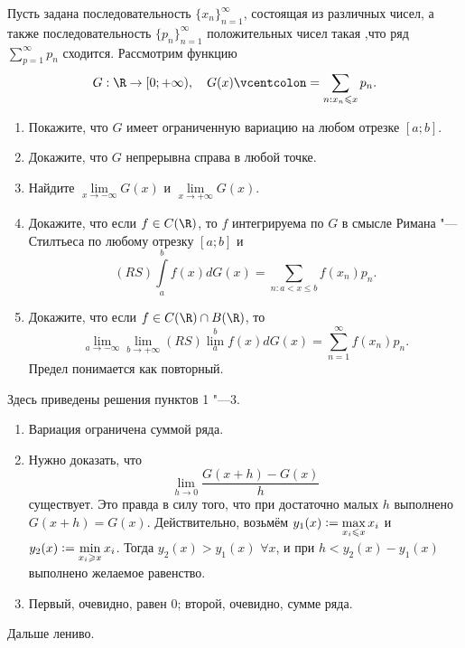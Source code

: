\begin{problem}[34]
    Пусть задана последовательность $\{x_n\}_{n = 1}^\infty$, состоящая из различных чисел, а также последовательность $\{p_n\}_{n = 1}^\infty$ положительных чисел такая ,что ряд $\sum\limits_{p = 1}^\infty p_n$ сходится. Рассмотрим функцию
    \[
        G: \R \to [0; +\infty),\quad G(x) \vcentcolon = \sum_{n: x_n \leqslant x}p_n.
    \]
    \begin{enumerate}[nolistsep]
        \item Покажите, что $G$ имеет ограниченную вариацию на любом отрезке $[a; b]$.
        \item Докажите, что $G$ непрерывна справа в любой точке.
        \item Найдите $\lim\limits_{x \to -\infty}G(x)$ и $\lim\limits_{x \to +\infty}G(x)$.
        \item Докажите, что если $f \in C(\R)$, то $f$ интегрируема по $G$ в смысле Римана "---Стилтьеса по любому отрезку $[a; b]$ и
            \[
                (RS)\int\limits_a^bf(x)dG(x) = \sum_{n: a < x \leqslant b}f(x_n)p_n.
            \]
        \item Докажите, что если $f \in C(\R) \cap B(\R)$, то
            \[
                \lim_{a \to -\infty}\lim_{b \to +\infty}(RS)\lim\limits_a^bf(x)dG(x) = \sum_{n = 1}^\infty f(x_n)p_n.
            \]
            Предел понимается как повторный.
    \end{enumerate}
\end{problem}

\begin{solution}
    Здесь приведены решения пунктов 1 "---3.
    \begin{enumerate}
        \item Вариация ограничена суммой ряда.
        \item Нужно доказать, что
            \[
                \lim_{h \to 0}\frac{G(x + h) - G(x)}{h}
            \]
            существует. Это правда в силу того, что при достаточно малых $h$ выполнено $G(x + h) = G(x)$. Действительно, возьмём $y_1(x) \vcentcolon = \max\limits_{x_i \leqslant x}x_i$ и $y_2(x) \vcentcolon = \min\limits_{x_i \geqslant x}x_i$. Тогда $y_2(x) > y_1(x)$ $\forall x$, и при $h < y_2(x) - y_1(x)$ выполнено желаемое равенство.
        \item Первый, очевидно, равен $0$; второй, очевидно, сумме ряда.
    \end{enumerate}

    Дальше лениво.
\end{solution}

